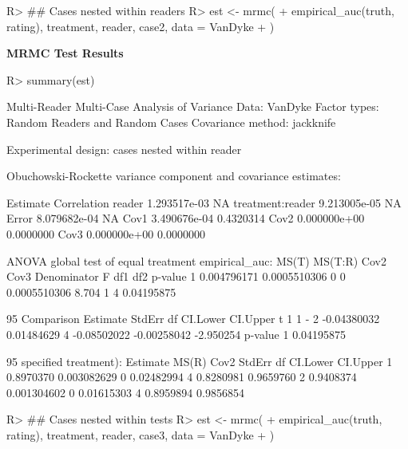 \documentclass[
]{jss}
\begin{document}
\begin{CodeChunk}
\begin{CodeInput}
R> ## Cases nested within readers
R> est <- mrmc(
+   empirical_auc(truth, rating), treatment, reader, case2, data = VanDyke
+ )
\end{CodeInput}
\end{CodeChunk}

\textbf{MRMC Test Results}

\begin{CodeChunk}
\begin{CodeInput}
R> summary(est)
\end{CodeInput}
\begin{CodeOutput}
Multi-Reader Multi-Case Analysis of Variance
Data: VanDyke
Factor types: Random Readers and Random Cases
Covariance method: jackknife

Experimental design: cases nested within reader 

Obuchowski-Rockette variance component and covariance estimates:

                     Estimate Correlation
reader           1.293517e-03          NA
treatment:reader 9.213005e-05          NA
Error            8.079682e-04          NA
Cov1             3.490676e-04   0.4320314
Cov2             0.000000e+00   0.0000000
Cov3             0.000000e+00   0.0000000


ANOVA global test of equal treatment empirical_auc:
        MS(T)      MS(T:R) Cov2 Cov3  Denominator     F df1 df2    p-value
1 0.004796171 0.0005510306    0    0 0.0005510306 8.704   1   4 0.04195875


95%
  Comparison    Estimate     StdErr df    CI.Lower    CI.Upper         t
1      1 - 2 -0.04380032 0.01484629  4 -0.08502022 -0.00258042 -2.950254
     p-value
1 0.04195875


95%
specified treatment):
   Estimate       MS(R) Cov2     StdErr df  CI.Lower  CI.Upper
1 0.8970370 0.003082629    0 0.02482994  4 0.8280981 0.9659760
2 0.9408374 0.001304602    0 0.01615303  4 0.8959894 0.9856854
\end{CodeOutput}
\end{CodeChunk}

\begin{CodeChunk}
\begin{CodeInput}
R> ## Cases nested within tests
R> est <- mrmc(
+   empirical_auc(truth, rating), treatment, reader, case3, data = VanDyke
+ )
\end{CodeInput}
\end{CodeChunk}
\end{document}

